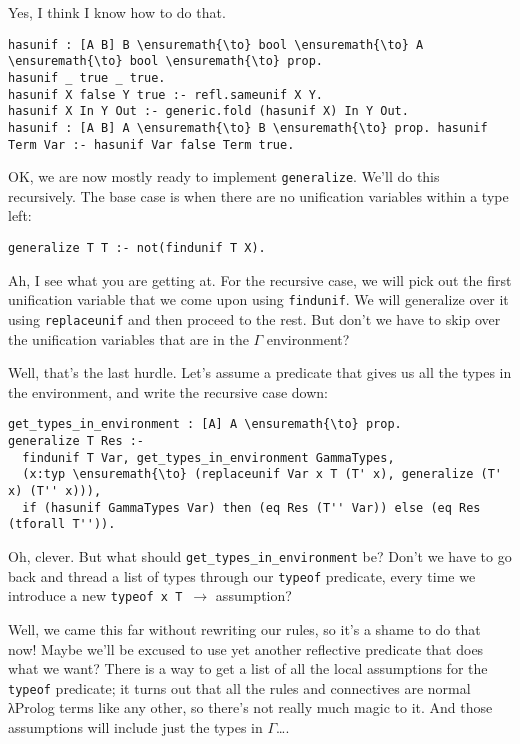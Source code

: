 \heroSTUDENT{} Yes, I think I know how to do that.

\begin{verbatim}
hasunif : [A B] B \ensuremath{\to} bool \ensuremath{\to} A \ensuremath{\to} bool \ensuremath{\to} prop.
hasunif _ true _ true.
hasunif X false Y true :- refl.sameunif X Y.
hasunif X In Y Out :- generic.fold (hasunif X) In Y Out.
hasunif : [A B] A \ensuremath{\to} B \ensuremath{\to} prop. hasunif Term Var :- hasunif Var false Term true.
\end{verbatim}

\heroADVISOR{} OK, we are now mostly ready to implement \texttt{generalize}.
We'll do this recursively. The base case is when there are no
unification variables within a type left:

\begin{verbatim}
generalize T T :- not(findunif T X).
\end{verbatim}

\heroSTUDENT{} Ah, I see what you are getting at. For the recursive case, we
will pick out the first unification variable that we come upon using
\texttt{findunif}. We will generalize over it using \texttt{replaceunif}
and then proceed to the rest. But don't we have to skip over the
unification variables that are in the \(\Gamma\) environment?

\heroADVISOR{} Well, that's the last hurdle. Let's assume a predicate that
gives us all the types in the environment, and write the recursive case
down:

\begin{verbatim}
get_types_in_environment : [A] A \ensuremath{\to} prop.
generalize T Res :- 
  findunif T Var, get_types_in_environment GammaTypes,
  (x:typ \ensuremath{\to} (replaceunif Var x T (T' x), generalize (T' x) (T'' x))),
  if (hasunif GammaTypes Var) then (eq Res (T'' Var)) else (eq Res (tforall T'')).
\end{verbatim}

\heroSTUDENT{} Oh, clever. But what should
\texttt{get\_types\_in\_environment} be? Don't we have to go back and
thread a list of types through our \texttt{typeof} predicate, every time
we introduce a new \texttt{typeof\ x\ T\ \ensuremath{\to}} assumption?

\heroADVISOR{} Well, we came this far without rewriting our rules, so it's a
shame to do that now! Maybe we'll be excused to use yet another
reflective predicate that does what we want? There is a way to get a
list of all the local assumptions for the \texttt{typeof} predicate; it
turns out that all the rules and connectives are normal \foreignlanguage{greek}{λ}Prolog terms
like any other, so there's not really much magic to it. And those
assumptions will include just the types in \(\Gamma\)\ldots{}.

